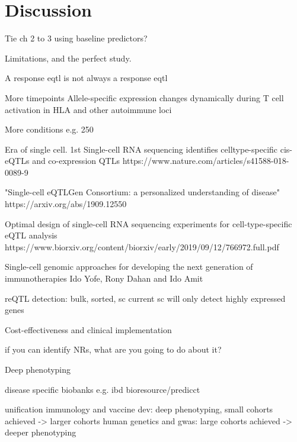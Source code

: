 %
%

\chapter{Discussion}

Tie ch 2 to 3 using baseline predictors?

Limitations, and the perfect study.

A response eqtl is not always a response eqtl

More timepoints
Allele-specific expression changes dynamically during T cell activation in HLA and other autoimmune loci

More conditions
e.g. 250

Era of single cell.
    1st
    Single-cell RNA sequencing identifies celltype-specific cis-eQTLs and co-expression QTLs
    https://www.nature.com/articles/s41588-018-0089-9

    "Single-cell eQTLGen Consortium: a personalized understanding of disease"
    https://arxiv.org/abs/1909.12550

    Optimal design of single-cell RNA sequencing experiments for cell-type-specific eQTL analysis
    https://www.biorxiv.org/content/biorxiv/early/2019/09/12/766972.full.pdf

    Single-cell genomic approaches for developing the next generation of immunotherapies Ido Yofe, Rony Dahan and Ido Amit


    reQTL detection: bulk, sorted, sc
    current sc will only detect highly expressed genes

Cost-effectiveness and clinical implementation

    if you can identify NRs, what are you going to do about it?

Deep phenotyping
    
    disease specific biobanks e.g. ibd bioresource/predicct

unification
    immunology and vaccine dev: deep phenotyping, small cohorts achieved -> larger cohorts
    human genetics and gwas: large cohorts achieved -> deeper phenotyping


